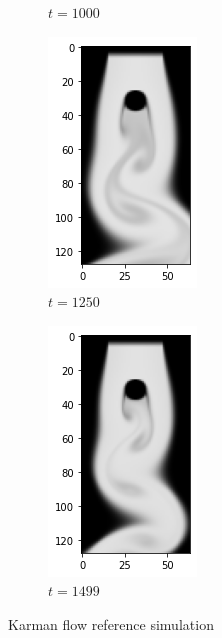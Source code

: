 \documentclass[a4paper,12pt,twoside]{report}
\begin{document}
\begin{figure}
\begin{subfigure}{0.18\textwidth}
		\caption{$t=1000$}
	\end{subfigure}
	\begin{subfigure}{0.18\textwidth}
		\centering
		\includegraphics[scale=0.5]{karmanflow/ref_density_001250.png}
		\caption{$t=1250$}
	\end{subfigure}
	\begin{subfigure}{0.18\textwidth}
		\centering
		\includegraphics[scale=0.5]{karmanflow/ref_density_001499.png}
		\caption{$t=1499$}
	\end{subfigure}
	\caption{Karman flow reference simulation}
\end{figure}
\end{document}
